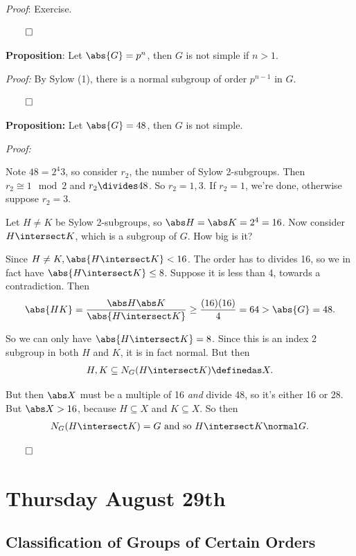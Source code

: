 \emph{Proof}: Exercise.

\(\qed\)

\textbf{Proposition}: Let \(\abs{G} = p^n\), then \(G\) is not simple if
\(n > 1\).

\emph{Proof:} By Sylow (1), there is a normal subgroup of order
\(p^{n-1}\) in \(G\).

\(\qed\)

\textbf{Proposition:} Let \(\abs{G} = 48\), then \(G\) is not simple.

\emph{Proof:}

Note \(48 = 2^4 3\), so consider \(r_2\), the number of Sylow
2-subgroups. Then \(r_2 \cong 1 \mod 2\) and \(r_2 \divides 48\). So
\(r_2 = 1, 3\). If \(r_2 = 1\), we're done, otherwise suppose
\(r_2 = 3\).

Let \(H \neq K\) be Sylow 2-subgroups, so
\(\abs H = \abs K = 2^4 = 16\). Now consider \(H \intersect K\), which
is a subgroup of \(G\). How big is it?

Since \(H\neq K, \abs{H \intersect K} < 16\). The order has to divides
16, so we in fact have \(\abs{H \intersect K} \leq 8\). Suppose it is
less than 4, towards a contradiction. Then
\begin{align*}
\abs{HK} = \frac{\abs H \abs K}{\abs{H \intersect K}} \geq \frac{(16)(16)}{4} = 64 > \abs{G} = 48.
\end{align*}

So we can only have \(\abs{H \intersect K} = 8\). Since this is an index
2 subgroup in both \(H\) and \(K\), it is in fact normal. But then
\begin{align*}
H, K \subseteq N_G(H \intersect K) \definedas X
.\end{align*}

But then \(\abs X\) must be a multiple of 16 \emph{and} divide 48, so
it's either 16 or 28. But \(\abs X > 16\), because \(H \subseteq X\) and
\(K \subseteq X\). So then
\begin{align*}
N_G(H \intersect K) = G \text{ and so } H \intersect K \normal G
.\end{align*}

\(\qed\)

\hypertarget{thursday-august-29th}{%
\section{Thursday August 29th}\label{thursday-august-29th}}

\hypertarget{classification-of-groups-of-certain-orders}{%
\subsection{Classification of Groups of Certain
Orders}\label{classification-of-groups-of-certain-orders}}

